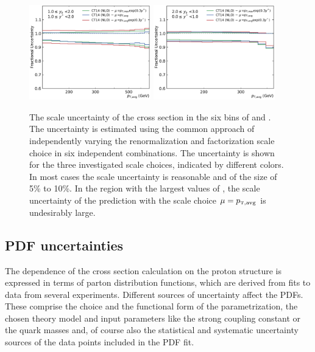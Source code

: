 \begin{figure}[htp]
    \includegraphics[width=0.47\textwidth]{figures/theory/scale_uncert_comp_yb1ys1.pdf}\hfill
    \includegraphics[width=0.47\textwidth]{figures/theory/scale_uncert_comp_yb2ys0.pdf}
    \caption[Scale Uncertainties of NLO calculation]{The scale uncertainty of
        the cross section in the six bins of \ystar and
        \yboost. The uncertainty is estimated using the common approach of
        independently varying the renormalization and factorization scale choice
        in six independent combinations. The uncertainty is shown for the three
        investigated scale choices, indicated by different colors. In most cases
        the scale uncertainty is reasonable and of the size of 5\% to 10\%. In
        the region with the largest values of \ystar, the scale uncertainty of
        the prediction with the scale choice $\mu=\ptavg$ is undesirably large.}
    \label{fig:scale_uncertainties}
\end{figure}

\subsection{PDF uncertainties}
\label{sec:pdf_uncertainties}

The dependence of the cross section calculation on the proton structure is
expressed in terms of parton distribution functions, which are derived from fits
to data from several experiments. Different sources of uncertainty affect the
PDFs. These comprise the choice and the functional form of the parametrization,
the chosen theory model and input parameters like the strong coupling constant
\as or the quark masses and, of course also the statistical and systematic
uncertainty sources of the data points included in the PDF fit.

